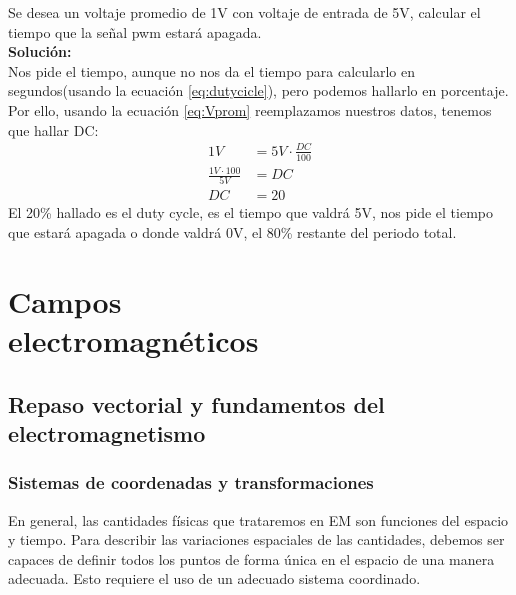 \documentclass[
	11pt, %
	fleqn, %
	a4paper, %
]{LegrandOrangeBook}
\begin{document}
\begin{exercise}
Se desea un voltaje promedio de 1V con voltaje de entrada de 5V, calcular el tiempo que la señal pwm estará apagada.\\
\textbf{Solución:}\\
Nos pide el tiempo, aunque no nos da el tiempo para calcularlo en segundos(usando la ecuación \ref{eq:dutycicle}), pero podemos hallarlo en porcentaje. Por ello, usando la ecuación \ref{eq:Vprom} reemplazamos nuestros datos, tenemos que hallar DC:
\begin{equation}
\begin{split}
1V&=5V\cdot\frac{DC}{100}\\
\frac{1V\cdot 100}{5V}&=DC\\
DC&=20
\end{split}
\end{equation}
El 20\% hallado es el duty cycle, es el tiempo que valdrá 5V, nos pide el tiempo que estará apagada o donde valdrá 0V, el 80\% restante del periodo total.
\end{exercise}
\part{Campos \\electromagnéticos}
\chapter{Repaso vectorial y fundamentos del electromagnetismo}
\section{Sistemas de coordenadas y transformaciones}
En general, las cantidades físicas que trataremos en EM son funciones del espacio y tiempo. Para describir las variaciones espaciales de las cantidades, debemos ser capaces de definir todos los puntos de forma única en el espacio de una manera adecuada. Esto requiere el uso de un adecuado sistema coordinado.
\end{document}
